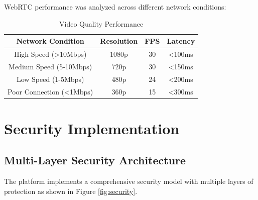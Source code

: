 \documentclass[conference]{IEEEtran}
\begin{document}
WebRTC performance was analyzed across different network conditions:

\begin{table}[H]
\centering
\caption{Video Quality Performance}
\label{tab:video_quality}
\begin{tabular}{|c|c|c|c|}
\hline
\textbf{Network Condition} & \textbf{Resolution} & \textbf{FPS} & \textbf{Latency} \\
\hline
High Speed (>10Mbps) & 1080p & 30 & <100ms \\
Medium Speed (5-10Mbps) & 720p & 30 & <150ms \\
Low Speed (1-5Mbps) & 480p & 24 & <200ms \\
Poor Connection (<1Mbps) & 360p & 15 & <300ms \\
\hline
\end{tabular}
\end{table}

\section{Security Implementation}

\subsection{Multi-Layer Security Architecture}

The platform implements a comprehensive security model with multiple layers of protection as shown in Figure \ref{fig:security}.
\end{document}
